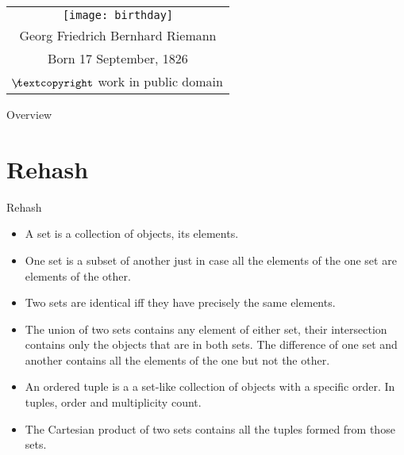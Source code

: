 \setcounter{framenumber}{97}
\begin{frame}
	\maketitle
\end{frame}

\begin{frame}
\begin{center}
			\begin{tabular}{c}
			 	\texttt{[image: birthday]}\\
				Georg Friedrich Bernhard Riemann\\
				Born 17 September, 1826\\
				{\tiny $\not\hspace{-1ex}\textcopyright$ work in public domain} 
			\end{tabular}
		\end{center}	

\end{frame}

\begin{frame}{Overview}
\tableofcontents
\end{frame}

\section{Rehash}
\begin{frame}{Rehash}
	
\begin{itemize}

		\item A set is a collection of objects, its elements.
		
		\item One set is a subset of another just in case all the elements of the one set are elements of the other. 
				
		\item Two sets are identical iff they have precisely the same elements. 
		
		\item The union of two sets contains any element of either set, their intersection contains only the objects that are in both sets. The difference of one set and another contains all the elements of the one but not the other.
		
		\item An ordered tuple is a a set-like collection of objects with a specific order. In tuples, order and multiplicity count.
		
		\item The Cartesian product of two sets contains all the tuples formed from those sets.
		
		\end{itemize}
		
	\end{frame}
		
